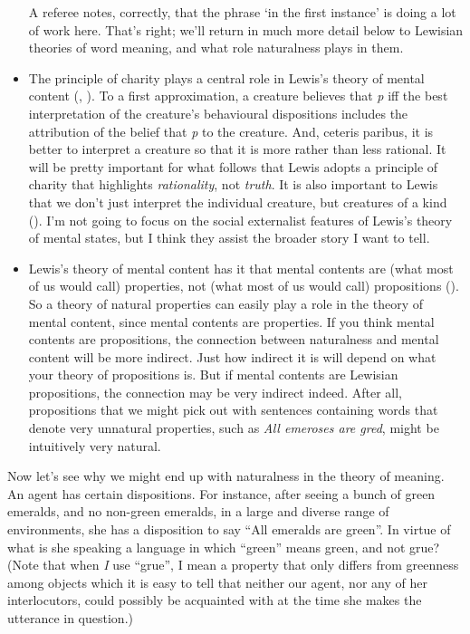 \documentclass[
  11pt,
  letterpaper,
  DIV=11,
  numbers=noendperiod,
  twoside]{scrartcl}
\begin{document}
\begin{itemize}
{    A referee notes, correctly, that the phrase `in the first instance'
    is doing a lot of work here. That's right; we'll return in much more
    detail below to Lewisian theories of word meaning, and what role
    naturalness plays in them.}
\item
  The principle of charity plays a central role in Lewis's theory of
  mental content (,
  ). To a first approximation, a creature
  believes that \emph{p} iff the best interpretation of the creature's
  behavioural dispositions includes the attribution of the belief that
  \emph{p} to the creature. And, ceteris paribus, it is better to
  interpret a creature so that it is more rather than less rational. It
  will be pretty important for what follows that Lewis adopts a
  principle of charity that highlights \emph{rationality}, not
  \emph{truth}. It is also important to Lewis that we don't just
  interpret the individual creature, but creatures of a kind
  (). I'm not going to focus on the
  social externalist features of Lewis's theory of mental states, but I
  think they assist the broader story I want to tell.
\item
  Lewis's theory of mental content has it that mental contents are (what
  most of us would call) properties, not (what most of us would call)
  propositions (). So a theory of
  natural properties can easily play a role in the theory of mental
  content, since mental contents are properties. If you think mental
  contents are propositions, the connection between naturalness and
  mental content will be more indirect. Just how indirect it is will
  depend on what your theory of propositions is. But if mental contents
  are Lewisian propositions, the connection may be very indirect indeed.
  After all, propositions that we might pick out with sentences
  containing words that denote very unnatural properties, such as
  \emph{All emeroses are gred}, might be intuitively very natural.
\end{itemize}

Now let's see why we might end up with naturalness in the theory of
meaning. An agent has certain dispositions. For instance, after seeing a
bunch of green emeralds, and no non-green emeralds, in a large and
diverse range of environments, she has a disposition to say ``All
emeralds are green''. In virtue of what is she speaking a language in
which ``green'' means green, and not grue? (Note that when \emph{I} use
``grue'', I mean a property that only differs from greenness among
objects which it is easy to tell that neither our agent, nor any of her
interlocutors, could possibly be acquainted with at the time she makes
the utterance in question.)
\end{document}
